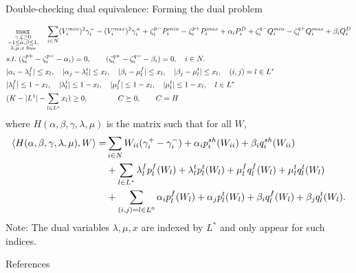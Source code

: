 \documentclass[xcolor=dvipsnames]{beamer}
\newcommand{\ii}{i}
\newcommand{\llll}{l}
\newcommand{\WW}{W}
\begin{document}
\begin{frame}{Double-checking dual equivalence: Forming the dual problem}
\begin{tiny}
\begin{subequations}
\begin{align}
& \max_{\substack{\gamma,\zeta \ge 0\\-1\le \alpha,\beta \le 1,\\ \lambda,\mu,x\; \text{free}}} \quad 
 \sum_{\ii \in N}  (V_\ii^{min})^2 \gamma_\ii^- - (V_\ii^{max})^2 \gamma_\ii^+ + \zeta_\ii^{p-}P_\ii^{min} - \zeta_\ii^{p+}P_\ii^{max} +\alpha_\ii P_\ii^D 
+ \zeta_\ii^{q-}Q_\ii^{min} - \zeta_\ii^{q+}Q_\ii^{max} + \beta_\ii Q_\ii^D \notag \\
&s.t.\; (\zeta_\ii^{p+}-\zeta_\ii^{p-} - \alpha_\ii) = 0, \qquad (\zeta_\ii^{q+}-\zeta_\ii^{q-} - \beta_\ii) = 0,\quad \ii \in N. \notag \\
& | \alpha_i -\lambda_\llll^f| \le x_l,\quad| \alpha_j - \lambda_l^t| \le x_l,\quad |\beta_i - \mu_l^f | \le x_l,\quad|\beta_j - \mu_l^t| \le x_l,\quad (i,j)=l \in L^* \notag \\
& |\lambda_l^f| \le 1-x_l,\quad |\lambda_l^t| \le 1-x_l,\quad|\mu_l^f| \le 1-x_l,\quad |\mu_l^t| \le 1-x_l,\quad l \in L^* \notag \\
& (K-|L^1|-\sum_{l \in L^*} x_l) \ge 0, \qquad\qquad C \succeq 0\notag, \qquad C=H\\
\end{align}
\end{subequations}
where $H(\alpha,\beta,\gamma,\lambda,\mu)$ is the matrix such that for all $\WW$, 
\begin{align*}
\langle H(\alpha,\beta,\gamma,\lambda,\mu), W \rangle = &\sum_{\ii \in N} W_{\ii\ii}(\gamma_\ii^+-\gamma_\ii^-) + \alpha_\ii p_\ii^{sh}(\WW_{ii}) + \beta_\ii q_\ii^{sh}(\WW_{ii}) \\
&+ \sum_{l \in L^*} \lambda_l^f p_l^f(\WW_l) + \lambda_l^t p_l^t(\WW_l) + \mu_l^f q_l^f(\WW_l) + \mu_l^t q_l^t(\WW_l) \notag \\
&+ \sum_{(i,j)=l \in L^0} \alpha_i p_l^f(\WW_l) + \alpha_j p_l^t(\WW_l) + \beta_i q_l^f(\WW_l) + \beta_j q_l^t(\WW_l).
\end{align*}
Note: The dual variables $\lambda,\mu,x$ are indexed by $L^*$ and only appear for such indices.
\end{tiny}
\end{frame}




 


\begin{frame}[allowframebreaks]{References} 

 
%



\end{frame}
      
\end{document}
